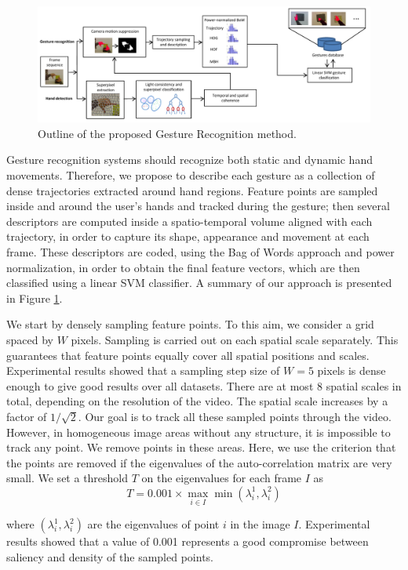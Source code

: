 \begin{figure}
\centering
\includegraphics[width=\linewidth]{Figures/schema.pdf}
\caption{Outline of the proposed Gesture Recognition method.}
\label{schema}
\end{figure}
Gesture recognition systems should recognize both static and dynamic hand movements. Therefore, we propose to describe each gesture as a collection of dense trajectories extracted around hand regions. Feature points are sampled inside and around the user's hands and tracked during the gesture; then several descriptors are computed inside a spatio-temporal volume aligned with each trajectory, in order to capture its shape, appearance and movement at each frame. 
These descriptors are coded,  using the Bag of Words approach and power normalization, in order to obtain the final feature vectors, which are then classified using a linear SVM classifier. A summary of our approach is presented in Figure \ref{schema}.

We start by densely sampling feature points. To this aim, we consider a grid spaced by $W$ pixels. Sampling is carried out on each
spatial scale separately. This guarantees that feature points equally cover all spatial
positions and scales. Experimental results showed that a sampling step size of $W = 5$ pixels is dense
enough to give good results over all datasets. There are at most 8 spatial scales in total, depending on the
resolution of the video. The spatial scale increases by a factor of $1/\sqrt{2}$.
Our goal is to track all these sampled points through the video. However, in homogeneous image
areas without any structure, it is impossible to track any point. We remove points in these areas. Here, we
use the criterion that the points are removed if the eigenvalues of the auto-correlation
matrix are very small. We set a threshold $T$ on the eigenvalues for each frame $I$ as
\begin{equation}
T = 0.001 \times \max_{i\in I} \min(\lambda_i^1, \lambda_i^2)
\end{equation}

where $(\lambda_i^1, \lambda_i^2)$ are the eigenvalues of point $i$ in the image $I$. Experimental results showed that a value
of 0.001 represents a good compromise between saliency and density of the sampled points.


